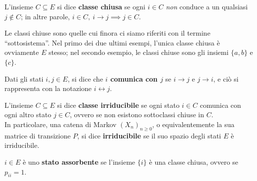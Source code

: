 \begin{defn}\label{def-classe-chiusa}
	L'insieme $C \subseteq E$ si dice \textbf{classe chiusa} se ogni $i \in C$ \emph{non} conduce
	a un qualsiasi $j \notin C$; in altre parole, $i \in C, \ i \to j \implies j \in C$.
\end{defn}
Le classi chiuse sono quelle cui finora ci siamo riferiti con il termine ``sottosistema''.
Nel primo dei due ultimi esempi, l'unica classe chiusa è ovviamente $E$ stesso; nel secondo esempio,
le classi chiuse sono gli insiemi $\{a,b\}$ e $\{c\}$.

\begin{defn}\label{def-comunica}
	Dati gli stati $i,j \in E$, si dice che \textbf{$i$ comunica con $j$} se $i \to j$ e $j \to i$,
	 e ciò si rappresenta con la notazione $i \leftrightarrow j$.
\end{defn}

\begin{defn}\label{def-classe-irrid}\label{def-catena-irrid}
	L'insieme $C \subseteq E$ si dice \textbf{classe irriducibile} se ogni stato $i \in C$
	comunica con ogni altro stato $j \in C$, ovvero se non esistono sottoclassi chiuse in $C$. \\
	In particolare, una catena di Markov $(X_n)_{n \ge 0}$, o equivalentemente la sua matrice di transizione $P$, si dice \textbf{irriducibile} se il suo spazio degli stati $E$ è irriducibile.
\end{defn}

\begin{defn}\label{def-stato-assorb}
	$i \in E$ è uno \textbf{stato assorbente} se l'insieme $\{i\}$ è una classe chiusa, ovvero se $p_{ii} = 1$.
\end{defn}

